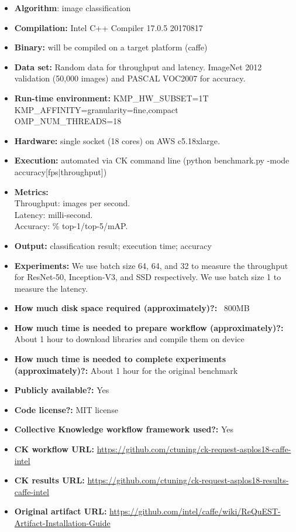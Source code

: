 \documentclass[sigplan]{acmart}
\begin{document}
\begin{itemize}
  \item {\bf Algorithm}: image classification
  \item {\bf Compilation: } Intel C++ Compiler 17.0.5 20170817
  \item {\bf Binary: } will be compiled on a target platform (caffe)
  \item {\bf Data set: } Random data for throughput and latency. ImageNet 2012 validation (50,000 images) and PASCAL VOC2007 for accuracy.
  \item {\bf Run-time environment: }
  KMP\_HW\_SUBSET=1T \\
  KMP\_AFFINITY=granularity=fine,compact \\
  OMP\_NUM\_THREADS=18
  \item {\bf Hardware: } single socket (18 cores) on AWS c5.18xlarge.
  \item {\bf Execution: } automated via CK command line (python benchmark.py -mode \newline accuracy[fps$|$throughput])
  \item {\bf Metrics: } \\ Throughput: images per second. \\ Latency: milli-second. \\ Accuracy: \% top-1/top-5/mAP.
  \item {\bf Output: } classification result; execution time; accuracy
  \item {\bf Experiments: } We use batch size 64, 64, and 32 to measure the throughput for ResNet-50, Inception-V3, and SSD respectively. We use batch size 1 to measure the latency.
  \item {\bf How much disk space required (approximately)?:} ~800MB
  \item {\bf How much time is needed to prepare workflow (approximately)?:} About 1 hour to download libraries and compile them on device
  \item {\bf How much time is needed to complete experiments (approximately)?:} About 1 hour for the original benchmark
  \item {\bf Publicly available?:} Yes
  \item {\bf Code license?:} MIT license
  \item {\bf Collective Knowledge workflow framework used?:} Yes
  \item {\bf CK workflow URL:} \url{https://github.com/ctuning/ck-request-asplos18-caffe-intel}
  \item {\bf CK results URL:} \url{https://github.com/ctuning/ck-request-asplos18-results-caffe-intel}
  \item {\bf Original artifact URL:} \url{https://github.com/intel/caffe/wiki/ReQuEST-Artifact-Installation-Guide}

\end{itemize}
\end{document}
